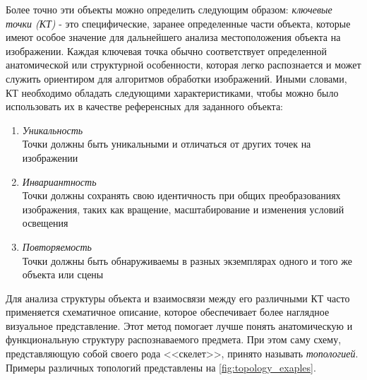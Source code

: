 Более точно эти объекты можно определить следующим образом: \textit{ключевые точки (КТ)} - это специфические, заранее определенные части объекта, которые имеют особое значение для дальнейшего анализа местоположения объекта на изображении. Каждая ключевая точка обычно соответствует определенной анатомической или структурной особенности, которая легко распознается и может служить ориентиром для алгоритмов обработки изображений. Иными словами, КТ необходимо обладать следующими характеристиками, чтобы можно было использовать их в качестве референсных для заданного объекта:
\begin{enumerate}
\item \textit{Уникальность}\\
Точки должны быть уникальными и отличаться от других точек на изображении
\item \textit{Инвариантность} \\
Точки должны сохранять свою идентичность при общих преобразованиях изображения, таких как вращение, масштабирование и изменения условий освещения 
\item \textit{Повторяемость} \\
Точки должны быть обнаруживаемы в разных экземплярах одного и того же объекта или сцены
\end{enumerate}

Для анализа структуры объекта и взаимосвязи между его различными КТ часто применяется схематичное описание, которое обеспечивает более наглядное визуальное представление. Этот метод помогает лучше понять анатомическую и функциональную структуру распознаваемого предмета. При этом саму схему, представляющую собой своего рода <<скелет>>, принято называть \textit{топологией}. Примеры различных топологий представлены на \autoref{fig:topology_exaples}.

